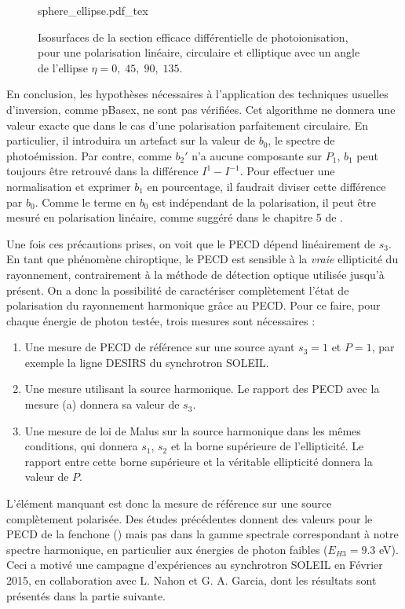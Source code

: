 \begin{figure}[!ht]
\centering
\def\svgwidth{1\columnwidth}
{sphere_ellipse.pdf_tex}
\caption{Isosurfaces de la section efficace différentielle de photoionisation, pour une polarisation linéaire, circulaire et elliptique avec un angle de l'ellipse $\eta=0,\;45,\;90,\;135$\degres.}
\label{fig:sphere_ell}
\end{figure}

En conclusion, les hypothèses nécessaires à l'application des techniques usuelles d'inversion, comme pBasex, ne sont pas vérifiées. Cet algorithme ne donnera une valeur exacte que dans le cas d'une polarisation parfaitement circulaire. En particulier, il introduira un artefact sur la valeur de $b_0$, le spectre de photoémission. Par contre, comme $b_2'$ n'a aucune composante sur $P_1$, $b_1$ peut toujours être retrouvé dans la différence $I^1-I^{-1}$. Pour effectuer une normalisation et exprimer $b_1$ en pourcentage, il faudrait diviser cette différence par $b_0$. Comme le terme en $b_0$ est indépendant de la polarisation, il peut être mesuré en polarisation linéaire, comme suggéré dans le chapitre 5 de .

Une fois ces précautions prises, on voit que le PECD dépend linéairement de $s_3$. En tant que phénomène chiroptique, le PECD est sensible à la \textit{vraie} ellipticité du rayonnement, contrairement à la méthode de détection optique utilisée jusqu'à présent. On a donc la possibilité de caractériser complètement l'état de polarisation du rayonnement harmonique grâce au PECD. Pour ce faire, pour chaque énergie de photon testée, trois mesures sont nécessaires :
\begin{enumerate}
\renewcommand{\theenumi}{\alph{enumi}}
\setlength\itemsep{1em}
\item Une mesure de PECD de référence sur une source ayant $s_3 = 1$ et $P = 1$, par exemple la ligne DESIRS du synchrotron SOLEIL. 
\item Une mesure utilisant la source harmonique. Le rapport des PECD avec la mesure (a) donnera sa valeur de $s_3$.
\item Une mesure de loi de Malus sur la source harmonique dans les mêmes conditions, qui donnera $s_1$, $s_2$ et la borne supérieure de l'ellipticité. Le rapport entre cette borne supérieure et la véritable ellipticité donnera la valeur de $P$.
\end{enumerate}
\vspace{12pt}
L'élément manquant est donc la mesure de référence sur une source complètement polarisée. Des études précédentes donnent des valeurs pour le PECD de la fenchone () mais pas dans la gamme spectrale correspondant à notre spectre harmonique, en particulier aux énergies de photon faibles ($E_{H3} = 9.3$ eV). Ceci a motivé une campagne d'expériences au synchrotron SOLEIL en Février 2015, en collaboration avec L. Nahon et G. A. Garcia, dont les résultats sont présentés dans la partie suivante.


